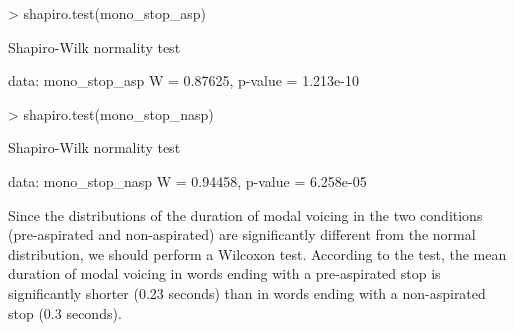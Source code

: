 \documentclass[a4paper,11pt]{article}
\begin{document}
\begin{Schunk}
\begin{Sinput}
> shapiro.test(mono_stop_asp)
\end{Sinput}
\begin{Soutput}
	Shapiro-Wilk normality test

data:  mono_stop_asp
W = 0.87625, p-value = 1.213e-10
\end{Soutput}
\begin{Sinput}
> shapiro.test(mono_stop_nasp)
\end{Sinput}
\begin{Soutput}
	Shapiro-Wilk normality test

data:  mono_stop_nasp
W = 0.94458, p-value = 6.258e-05
\end{Soutput}
\end{Schunk}

Since the distributions of the duration of modal voicing in the two conditions (pre-aspirated and non-aspirated) are significantly different from the normal distribution, we should perform a Wilcoxon test.
According to the test, the mean duration of modal voicing in words ending with a pre-aspirated stop is significantly shorter (0.23 seconds) than in words ending with a non-aspirated stop (0.3 seconds).
\end{document}
